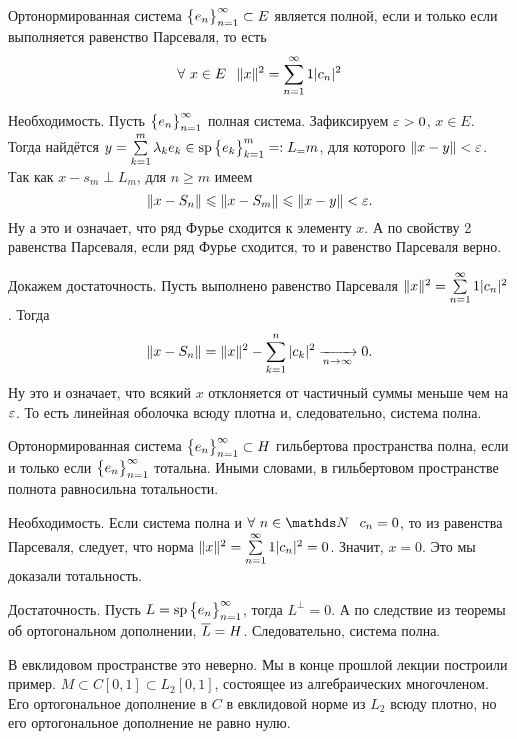\begin{The}[Стеклова]
	Ортонормированная система $\big\{{e}_{n}\big\}_{n=1}^\infty\subset E$ является полной, если и только если выполняется равенство Парсеваля, то есть
	\[
		\forall\ x\in E\pau \|x\|^2 = \rY n1|c_n|^2
	\]
\end{The}
\begin{Proof}
	Необходимость.
	Пусть $\big\{{e}_{n}\big\}_{n=1}^\infty$ полная система.
	Зафиксируем $\varepsilon>0$, $x \in E$. Тогда найдётся $y = \sum\limits_{k = 1}^{m}\lambda_k e_k\in \operatorname{sp}\big\{{e}_{k}\big\}_{k=1}^{m} = :L_=m$, для которого $\|x-y\|<\varepsilon$.
	Так как $x-s_m\perp L_m$, для $n\ge m$ имеем
	\[
		\|x-S_n\|\leqslant \|x-S_m\|\leqslant \|x-y\|<\varepsilon.
	\]
	Ну а это и означает, что ряд Фурье сходится к элементу $x$. А по свойству 2 равенства Парсеваля, если ряд Фурье сходится, то и равенство Парсеваля верно.

	Докажем достаточность. Пусть выполнено равенство Парсеваля $\|x\|^2 = \sum\limits_{{n}={1}}^\infty1|c_n|^2$. Тогда 
	\[
		\|x-S_n\| = \|x\|^2 - \sum\limits_{k = 1}^{n}|c_k|^2\xrightarrow[n\rightarrow\infty]{} 0.
	\]
	Ну это и означает, что всякий $x$ отклоняется от частичный суммы меньше чем на $\varepsilon$. То есть линейная оболочка всюду плотна и, следовательно, система полна.
\end{Proof}

\begin{Sl}
	Ортонормированная система $\big\{{e}_{n}\big\}_{n=1}^\infty\subset H$ гильбертова пространства полна, если и только если $\big\{{e}_{n}\big\}_{n=1}^\infty$ тотальна. Иными словами, в гильбертовом пространстве полнота равносильна тотальности.
\end{Sl}
\begin{Proof}
	Необходимость. Если система полна и $\forall\ n\in\N\pau c_n=0$, то из равенства Парсеваля, следует, что норма $\|x\|^2 = \sum\limits_{{n}={1}}^\infty1|c_n|^2 = 0$. Значит, $x=0$. Это мы доказали тотальность.

	Достаточность. Пусть $L = \operatorname{sp}\big\{{e}_{n}\big\}_{n=1}^\infty$, тогда $L^\perp = 0$. А по следствие из теоремы об ортогональном дополнении, $\overline{L} = H$. Следовательно, система полна.
\end{Proof}

В евклидовом пространстве это неверно. Мы в конце прошлой лекции построили пример. $M\subset C[0,1]\subset L_2[0,1]$, состоящее из алгебраических многочленом. Его ортогональное дополнение в $C$ в евклидовой норме из $L_2$ всюду плотно, но его ортогональное дополнение не равно нулю.

